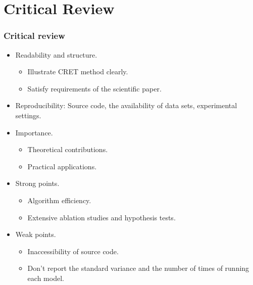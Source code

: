 \documentclass[notes, 10pt, aspectratio=169]{beamer}
\begin{document}
\section{Critical Review}
\begin{frame}
    \frametitle{Critical review} 
    \begin{itemize}
        \item Readability and structure.
            \begin{itemize}
                \item Illustrate CRET method clearly.
                \item Satisfy requirements of the scientific paper.
            \end{itemize}
        \item Reproducibility: Source code, the availability of data sets, experimental settings.
        \item Importance.
            \begin{itemize}
                \item Theoretical contributions.
                \item Practical applications.
            \end{itemize}
        \item Strong points.
            \begin{itemize}
                \item Algorithm efficiency.
                \item Extensive ablation studies and hypothesis tests.
            \end{itemize}
        \item Weak points.
            \begin{itemize}
                \item Inaccessibility of source code.
                \item Don't report the standard variance and the number of times of running each model.
            \end{itemize}
    \end{itemize}
\end{frame}
\end{document}

